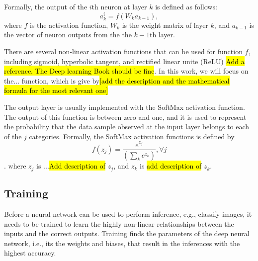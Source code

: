\documentclass[conference]{IEEEtran}
\begin{document}
Formally, the output of the $i$th neuron at layer $k$ is defined as follows:
$$a^i_k=f(W_k a_{k-1}),$$
where $f$ is the activation function, $W_k$ is the weight matrix of layer $k$,
and $a_{k-1}$ is the vector of neuron outputs from the the $k-1$th layer. 

There are several non-linear activation functions that can be used for function $f$, including sigmoid,
hyperbolic tangent, and rectified linear unite (ReLU) \cite{} \hl{Add a reference. The Deep learning Book should be fine}. In this
work, we will focus on the... function, which is give by\hl{[add the description and the mathematical formula for the most relevant
one]}


The output layer is usually implemented with the SoftMax activation function. The output of this function is between zero and
one, and it is used to represent the probability that the data sample observed at the input layer belongs to each of the $j$
categories. Formally, the SoftMax activation functions is defined by
$$f(z_j) = \frac{e^{z_j}} {(\sum_ke^{z_k})}, \forall j$$.
where $z_j$ is ...\hl{Add description of} $z_j$, and $z_k$ is \hl{add description of} $z_k$. 


\subsection{Training}
Before a neural network can be used to perform inference, e.g., classify images, it needs to be trained to learn the highly non-linear
relationships between the inputs and the correct outputs. Training finds the 
parameters of the deep neural network, i.e., its the weights and biases, that result in the inferences with the highest accuracy.  
\end{document}
